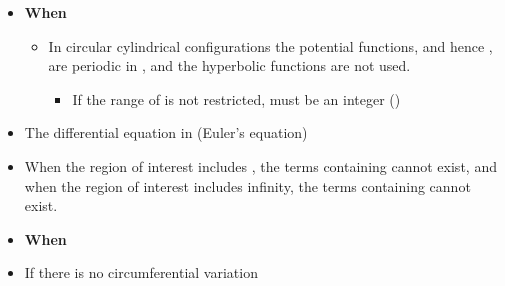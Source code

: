 \begin{ELunit}

\begin{itemize}
\tightlist
\item
  \textbf{When }

  \begin{itemize}
  \tightlist
  \item
    In circular cylindrical configurations the potential functions, and hence \ELim{\Phi(\phi)}, are periodic in \ELim{\phi}, and the hyperbolic functions are not used.

    \begin{itemize}
    \tightlist
    \item
      If the range of \ELim{\phi} is not restricted,  must be an integer ()
    \end{itemize}
  \end{itemize}
\end{itemize}


\begin{itemize}
\tightlist
\item
  The differential equation in  (Euler's equation)
\end{itemize}


\end{ELunit}

\begin{ELimportant}{}


\end{ELimportant}

\begin{ELunit}

\begin{itemize}
\item
  When the region of interest includes , the terms containing  cannot exist, and when the region of interest includes infinity, the terms containing  cannot exist.
\item
  \textbf{When }
\end{itemize}


\begin{itemize}
\tightlist
\item
  If there is no circumferential variation
\end{itemize}


\end{ELunit}

